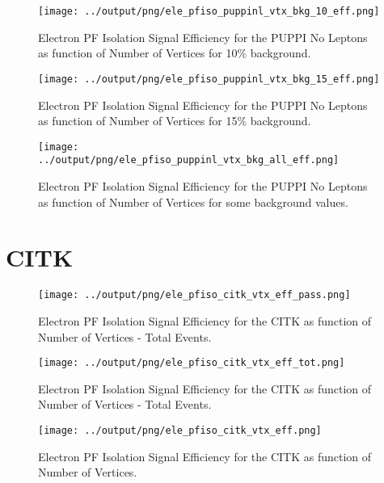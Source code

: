 \documentclass[11pt]{book}
\begin{document}
\begin{figure}[htb]
\centering
\texttt{[image: ../output/png/ele\_pfiso\_puppinl\_vtx\_bkg\_10\_eff.png]}
\caption{Electron PF Isolation Signal Efficiency for the PUPPI No Leptons as function of Number of Vertices for 10\% background.}
\label{fig:ele_pfiso_vtx_eff_puppinl_bkg_10_eff}
\end{figure}

\begin{figure}[htb]
\centering
\texttt{[image: ../output/png/ele\_pfiso\_puppinl\_vtx\_bkg\_15\_eff.png]}
\caption{Electron PF Isolation Signal Efficiency for the PUPPI No Leptons as function of Number of Vertices for 15\% background.}
\label{fig:ele_pfiso_vtx_eff_puppinl_bkg_15_eff}
\end{figure}

\begin{figure}[htb]
\centering
\texttt{[image: ../output/png/ele\_pfiso\_puppinl\_vtx\_bkg\_all\_eff.png]}
\caption{Electron PF Isolation Signal Efficiency for the PUPPI No Leptons as function of Number of Vertices for some background values.}
\label{fig:ele_pfiso_vtx_eff_puppinl_bkg_all_eff}
\end{figure}
\clearpage

\section{CITK}
\begin{figure}[htb]
\centering
\texttt{[image: ../output/png/ele\_pfiso\_citk\_vtx\_eff\_pass.png]}
\caption{Electron PF Isolation Signal Efficiency for the CITK as function of Number of Vertices - Total Events.}
\label{fig:ele_pfiso_vtx_eff_citk_pass}
\end{figure}

\begin{figure}[htb]
\centering
\texttt{[image: ../output/png/ele\_pfiso\_citk\_vtx\_eff\_tot.png]}
\caption{Electron PF Isolation Signal Efficiency for the CITK as function of Number of Vertices - Total Events.}
\label{fig:ele_pfiso_vtx_eff_citk_tot}
\end{figure}

\begin{figure}[htb]
\centering
\texttt{[image: ../output/png/ele\_pfiso\_citk\_vtx\_eff.png]}
\caption{Electron PF Isolation Signal Efficiency for the CITK as function of Number of Vertices.}
\label{fig:ele_pfiso_vtx_eff_citk}
\end{figure}
\end{document}
